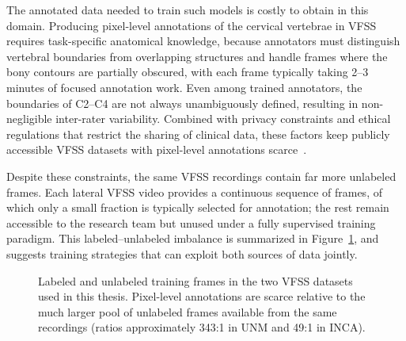 \documentclass[
  msc,
  american
]{ThesisPUC_v2}
\begin{document}
The annotated data needed to train such models is costly to obtain in this domain. Producing pixel-level annotations of the cervical vertebrae in VFSS requires task-specific anatomical knowledge, because annotators must distinguish vertebral boundaries from overlapping structures and handle frames where the bony contours are partially obscured, with each frame typically taking 2--3 minutes of focused annotation work. Even among trained annotators, the boundaries of C2--C4 are not always unambiguously defined, resulting in non-negligible inter-rater variability. Combined with privacy constraints and ethical regulations that restrict the sharing of clinical data, these factors keep publicly accessible VFSS datasets with pixel-level annotations scarce~\citep{ref_fakhry2025,ref_sanjeevi2025}.

Despite these constraints, the same VFSS recordings contain far more unlabeled frames. Each lateral VFSS video provides a continuous sequence of frames, of which only a small fraction is typically selected for annotation; the rest remain accessible to the research team but unused under a fully supervised training paradigm. This labeled--unlabeled imbalance is summarized in Figure~\ref{fig:annotation-bottleneck}, and suggests training strategies that can exploit both sources of data jointly.

\begin{figure}[!htbp]
  \centering
  \caption[Labeled and unlabeled training frames in UNM and INCA.]{Labeled and unlabeled training frames in the two VFSS datasets used in this thesis. Pixel-level annotations are scarce relative to the much larger pool of unlabeled frames available from the same recordings (ratios approximately 343:1 in UNM and 49:1 in INCA).}
  \label{fig:annotation-bottleneck}
\end{figure}
\end{document}
